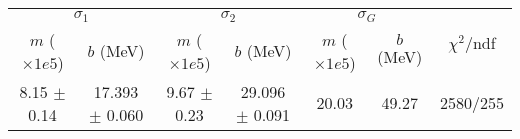 \begin{tabular}{cc|cc|cc||c}
\multicolumn{2}{c|}{$\sigma_1$} & \multicolumn{2}{|c}{$\sigma_2$} & \multicolumn{2}{|c}{$\sigma_G$}  & \multirow{2}{*}{$\chi^2/$ndf}\\
$m$ ($\times1e5$) & $b$ (MeV) & $m$ ($\times1e5$) & $b$ (MeV) & $m$ ($\times1e5$) & $b$ (MeV) & \\
\hline
8.15 $\pm$ 0.14 & 17.393 $\pm$ 0.060 & 9.67 $\pm$ 0.23 & 29.096 $\pm$ 0.091 & 20.03 & 49.27 & 2580/255\\
\end{tabular}

